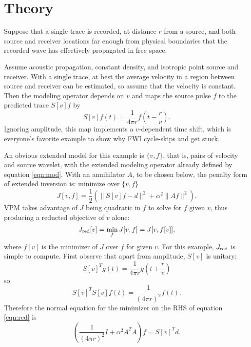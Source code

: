 \section{Theory}
Suppose that a single trace is recorded, at distance $r$ from a source, and both source and receiver locations far enough from physical boundaries that the recorded wave has effectively propagated in free space. 

Assume acoustic propagation, constant density, and isotropic point source and receiver. With a single trace, at best the average velocity in a region between source and receiver can be estimated, so assume that the velocity is constant. Then the modeling operator depends on $v$ and maps the source pulse $f$ to the predicted trace $S[v]f$ by
\begin{equation}
\label{eqn:mod}
S[v]f (t)= \frac{1}{4\pi r}f\left(t-\frac{r}{v}\right).
\end{equation}
Ignoring amplitude, this map implements a $v$-dependent time shift, which is everyone's favorite example to show why FWI cycle-skips and get stuck.

An obvious extended model for this example is $\{v,f\}$, that is, pairs of velocity and source wavelet, with the extended modeling operator already defined by equation \ref{eqn:mod}. With an annihilator $A$, to be chosen below, the penalty form of extended inversion is: minimize over $\{v,f\}$
\begin{equation}
\label{eqn:obj}
J[v,f] = \frac{1}{2}(\|S[v]f-d\|^2 + \alpha^2 \|Af\|^2).
\end{equation}
VPM \cite[]{GolubPereyra:03} takes advantage of $J$ being quadratic in $f$ to solve for $f$ given $v$, thus producing a reducted objective of $v$ alone:
\begin{equation}
\label{eqn:red}
J_{\rm red}[v] = \min_f J[v,f] = J[v,f[v]],
\end{equation}
where $f[v]$ is the minimizer of $J$ over $f$ for given $v$.
For this example, $J_{\rm red}$ is simple to compute. First observe that apart from amplitude, $S[v]$ is unitary:
\begin{equation}
\label{eqn:tran}
S[v]^T g (t) = \frac{1}{4\pi r}g\left(t+\frac{r}{v}\right)
\end{equation}
so
\begin{equation}
\label{eqn:unit}
S[v]^TS[v] f (t) = \frac{1}{(4\pi r)^2} f(t).
\end{equation}
Therefore the normal equation for the minimizer on the RHS of equation \ref{eqn:red} is
\begin{equation}
\label{eqn:norm1}
\left(\frac{1}{(4\pi r)^2} I + \alpha^2 A^TA\right)f = S[v]^Td.
\end{equation}

